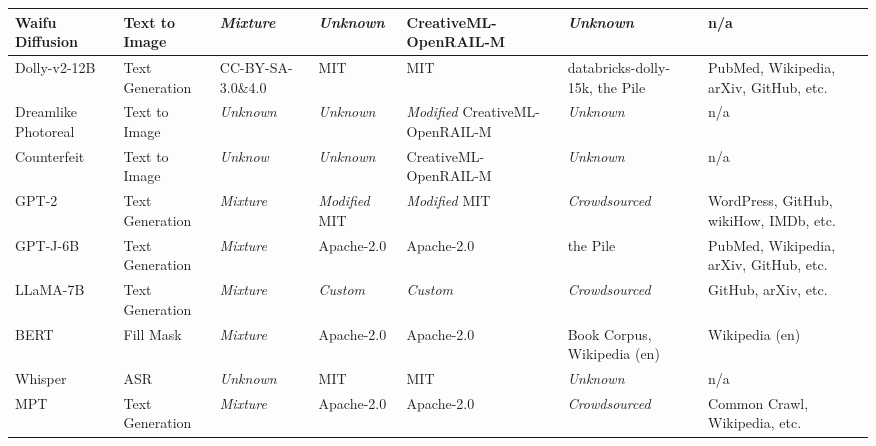 \begin{table*}[]
\begin{tabular}{|p{2.1cm}|p{1.6cm}|p{2cm}|p{2.75cm}|p{3cm}|p{1.7cm}|p{2cm}|}
        Waifu Diffusion & Text to Image & \textit{Mixture} & \textit{Unknown} & CreativeML-OpenRAIL-M & \textit{Unknown} & n/a \\ \hline

        Dolly-v2-12B & Text Generation & CC-BY-SA-3.0\&4.0 & MIT & MIT & databricks-dolly\newline-15k, the Pile & PubMed,  Wikipedia, \newline arXiv, GitHub, etc. \\ \hline

        Dreamlike Photoreal & Text to Image & \textit{Unknown} & \textit{Unknown} & \textit{Modified} CreativeML-\newline OpenRAIL-M & \textit{Unknown} & n/a \\ \hline

        Counterfeit & Text to Image & \textit{Unknow} & \textit{Unknown} & CreativeML-OpenRAIL-M & \textit{Unknown} & n/a \\ \hline

        GPT-2 & Text Generation & \textit{Mixture} & \textit{Modified} MIT & \textit{Modified} MIT & \textit{Crowdsourced} & WordPress, GitHub, \newline wikiHow, IMDb, etc. \\ \hline

        GPT-J-6B & Text Generation & \textit{Mixture} & Apache-2.0 & Apache-2.0 & the Pile & PubMed,  Wikipedia, \newline arXiv, GitHub, etc. \\ \hline

        LLaMA-7B & Text Generation & \textit{Mixture} & \textit{Custom} & \textit{Custom} & \textit{Crowdsourced} & GitHub, arXiv, etc. \\ \hline

        BERT & Fill Mask & \textit{Mixture} & Apache-2.0 & Apache-2.0 & Book Corpus, \newline Wikipedia (en) & Wikipedia (en) \\ \hline

        Whisper & ASR & \textit{Unknown} & MIT & MIT & \textit{Unknown} & n/a \\ \hline

        MPT & Text Generation & \textit{Mixture} & Apache-2.0 & Apache-2.0 & \textit{Crowdsourced} & Common Crawl, \newline Wikipedia, etc. \\ \hline
    

    \end{tabular}
\end{table*}